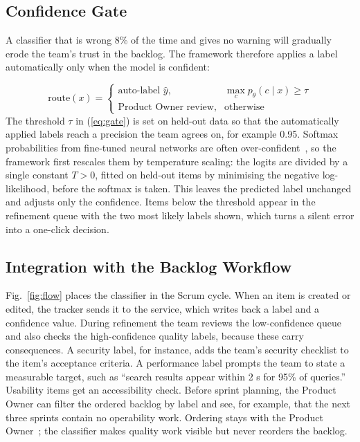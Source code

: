 \documentclass[conference,10pt,letterpaper]{IEEEtran}
\begin{document}
\subsection{Confidence Gate}\label{sec:gate}
A classifier that is wrong 8\% of the time and gives no warning will gradually erode the team's trust in the backlog. The framework therefore applies a label automatically only when the model is confident:

\begin{equation}
\mathrm{route}(x) = \begin{cases} \text{auto-label } \hat{y}, & \max_c p_\theta(c \mid x) \ge \tau \\ \text{Product Owner review}, & \text{otherwise} \end{cases}
\label{eq:gate}
\end{equation}
The threshold $\tau$ in (\ref{eq:gate}) is set on held-out data so that the automatically applied labels reach a precision the team agrees on, for example 0.95. Softmax probabilities from fine-tuned neural networks are often over-confident~\cite{guo2017calibration}, so the framework first rescales them by temperature scaling: the logits are divided by a single constant $T>0$, fitted on held-out items by minimising the negative log-likelihood, before the softmax is taken. This leaves the predicted label unchanged and adjusts only the confidence. Items below the threshold appear in the refinement queue with the two most likely labels shown, which turns a silent error into a one-click decision.

\subsection{Integration with the Backlog Workflow}
Fig.~\ref{fig:flow} places the classifier in the Scrum cycle. When an item is created or edited, the tracker sends it to the service, which writes back a label and a confidence value. During refinement the team reviews the low-confidence queue and also checks the high-confidence quality labels, because these carry consequences. A security label, for instance, adds the team's security checklist to the item's acceptance criteria. A performance label prompts the team to state a measurable target, such as “search results appear within 2 s for 95\% of queries.” Usability items get an accessibility check. Before sprint planning, the Product Owner can filter the ordered backlog by label and see, for example, that the next three sprints contain no operability work. Ordering stays with the Product Owner~\cite{scrumguide2020}; the classifier makes quality work visible but never reorders the backlog.
\end{document}
